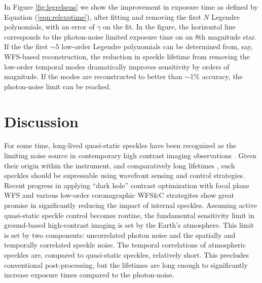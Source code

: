 \documentclass[11pt,preprint]{aastex}
\begin{document}
In Figure \ref{fig:legrelsens} we show the improvement in exposure time as defined by Equation (\ref{eqn:relexptime}), after fitting and removing the first $N$ Legendre polynomials, with an error of $\gamma$ on the fit.  In the figure, the horizontal line corresponds to the photon-noise limited exposure time on an 8th magnitude star.  If the the first $\sim$5 low-order Legendre polynomials can be determined from, say, WFS-based reconstruction, the reduction in speckle lifetime from removing the low-order temporal modes dramatically improves sensitivity by orders of magnitude.  If the modes are reconstructed to better than $\sim$1\% accuracy, the photon-noise limit can be reached.

\clearpage
\section{Discussion}
For some time, long-lived quasi-static speckles have been recognized as the limiting noise source in contemporary high contrast imaging observations \citep[e.g.][]{2007ApJ...654..633H}.  Given their origin within the instrument, and comparatively long lifetimes \citep{2012A&A...541A.136M}, such speckles should be supressable using wavefront sensing and control strategies.  Recent progress in applying ``dark hole'' contrast optimization with focal plane WFS \citep{2020A&A...638A.117P} and various low-order coronagraphic WFS\&C strategites \citep[e.g.][]{2017PASP..129i5002S} show great promise in significantly reducing the impact of internal speckles.  Assuming active quasi-static speckle control becomes routine, the fundamental sensitivity limit in ground-based high-contrast imaging is set by the Earth's atmosphere.  This limit is set by two components: uncorrelated photon noise and the spatially and temporally correlated speckle noise.  The temporal correlations of atmospheric speckles are, compared to quasi-static speckles, relatively short. This precludes conventional post-processing, but the lifetimes are long enough to significantly increase exposure times compared to the photon-noise.
\end{document}
